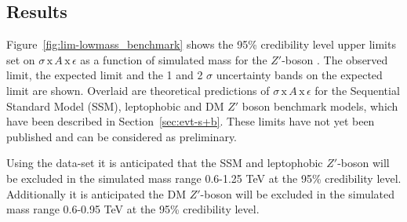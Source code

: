 \subsection{Results}
\label{sec:lim-full_results}

Figure~\ref{fig:lim-lowmass_benchmark} shows the
95\% credibility level upper limits set on $\sigma\,\text{x}\,\mathit{A}\,\text{x}\,\epsilon$
as a function of simulated mass for the $Z'$-boson .
The observed limit, the expected limit and the 1 and 2 $\sigma$ uncertainty bands on the expected limit are shown.
Overlaid are theoretical predictions of $\sigma\,\text{x}\,\mathit{A}\,\text{x}\,\epsilon$ for the
Sequential Standard Model (SSM), leptophobic and DM $Z'$ boson benchmark models, which have been described in Section~\ref{sec:evt-s+b}.
These limits have not yet been published and can be considered as preliminary.

Using the \lm{} data-set it is anticipated that the SSM and leptophobic $Z'$-boson
will be excluded in the simulated mass range 0.6-1.25 TeV at the 95\% credibility level.
Additionally it is anticipated the DM $Z'$-boson will be excluded in the simulated mass range
0.6-0.95 TeV  at the 95\% credibility level.


